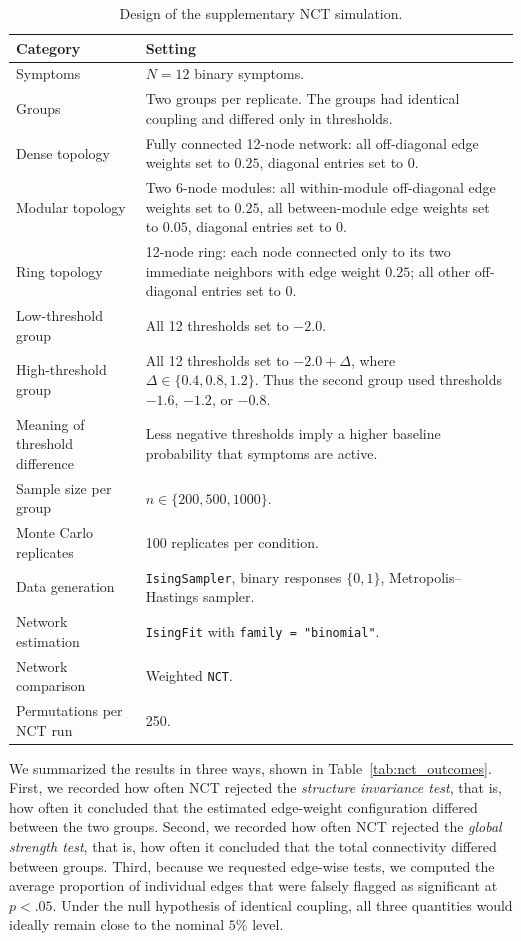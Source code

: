 \documentclass[man,12pt,floatsintext]{apa7}
\begin{document}
\begin{table}[htbp]
\centering
\begin{threeparttable}
\caption{Design of the supplementary NCT simulation.}
\label{tab:nct_design}
\footnotesize
\setlength{\tabcolsep}{6pt}
\renewcommand{\arraystretch}{1.15}
\begin{tabularx}{\linewidth}{@{} l X @{}}
\toprule
\textbf{Category} & \textbf{Setting} \\
\midrule
Symptoms & \(N=12\) binary symptoms. \\
Groups & Two groups per replicate. The groups had identical coupling and differed only in thresholds. \\
Dense topology & Fully connected 12-node network: all off-diagonal edge weights set to \(0.25\), diagonal entries set to \(0\). \\
Modular topology & Two 6-node modules: all within-module off-diagonal edge weights set to \(0.25\), all between-module edge weights set to \(0.05\), diagonal entries set to \(0\). \\
Ring topology & 12-node ring: each node connected only to its two immediate neighbors with edge weight \(0.25\); all other off-diagonal entries set to \(0\). \\
Low-threshold group & All 12 thresholds set to \(-2.0\). \\
High-threshold group & All 12 thresholds set to \(-2.0+\Delta\), where \(\Delta \in \{0.4, 0.8, 1.2\}\). Thus the second group used thresholds \(-1.6\), \(-1.2\), or \(-0.8\). \\
Meaning of threshold difference & Less negative thresholds imply a higher baseline probability that symptoms are active. \\
Sample size per group & \(n \in \{200, 500, 1000\}\). \\
Monte Carlo replicates & 100 replicates per condition. \\
Data generation & \texttt{IsingSampler}, binary responses \(\{0,1\}\), Metropolis--Hastings sampler. \\
Network estimation & \texttt{IsingFit} with \texttt{family = "binomial"}. \\
Network comparison & Weighted \texttt{NCT}. \\
Permutations per NCT run & 250. \\
\bottomrule
\end{tabularx}
\end{threeparttable}
\end{table}
We summarized the results in three ways, shown in Table~\ref{tab:nct_outcomes}. First, we recorded how often NCT rejected the \emph{structure invariance test}, that is, how often it concluded that the estimated edge-weight configuration differed between the two groups. Second, we recorded how often NCT rejected the \emph{global strength test}, that is, how often it concluded that the total connectivity differed between groups. Third, because we requested edge-wise tests, we computed the average proportion of individual edges that were falsely flagged as significant at \(p<.05\). Under the null hypothesis of identical coupling, all three quantities would ideally remain close to the nominal \(5\%\) level.
\end{document}
